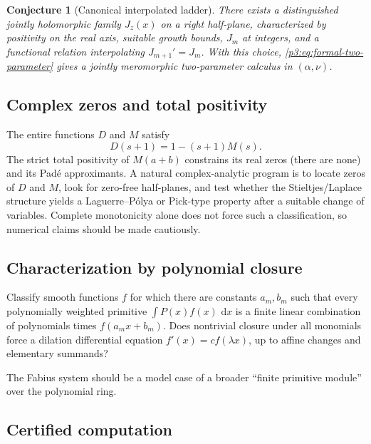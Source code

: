 \documentclass[11pt,oneside]{article}
\newtheorem{conjecture}[theorem]{Conjecture}
\theoremstyle{definition}
\theoremstyle{remark}
\newcommand{\dd}{\,\mathrm d}
\newcommand{\1}{\mathbf 1}
\begin{document}
\begin{conjecture}[Canonical interpolated ladder]
There exists a distinguished jointly holomorphic family $J_z(x)$ on a right half-plane,
characterized by positivity on the real axis, suitable growth bounds, $J_m$ at integers, and
a functional relation interpolating $J_{m+1}'=J_m$.  With this choice,
\eqref{p3:eq:formal-two-parameter} gives a jointly meromorphic two-parameter calculus in
$(\alpha,\nu)$.
\end{conjecture}

\subsection{Complex zeros and total positivity}

The entire functions $D$ and $M$ satisfy
\begin{equation}
 D(s+1)=1-(s+1)M(s).                                         \label{p3:eq:D-M}
\end{equation}
The strict total positivity of $M(a+b)$ constrains its real zeros (there are none) and its
Pad\'e approximants.  A natural complex-analytic program is to locate zeros of $D$ and $M$,
look for zero-free half-planes, and test whether the Stieltjes/Laplace structure yields a
Laguerre--P\'olya or Pick-type property after a suitable change of variables.  Complete
monotonicity alone does not force such a classification, so numerical claims should be made
cautiously.

\subsection{Characterization by polynomial closure}

\begin{problem}[Rigidity]
Classify smooth functions $f$ for which there are constants $a_m,b_m$ such that every
polynomially weighted primitive $\int P(x)f(x)\,\dd x$ is a finite linear combination of
polynomials times $f(a_mx+b_m)$.  Does nontrivial closure under all monomials force a
dilation differential equation $f'(x)=cf(\lambda x)$, up to affine changes and elementary
summands?
\end{problem}

The Fabius system should be a model case of a broader ``finite primitive module'' over the
polynomial ring.

\subsection{Certified computation}
\end{document}
